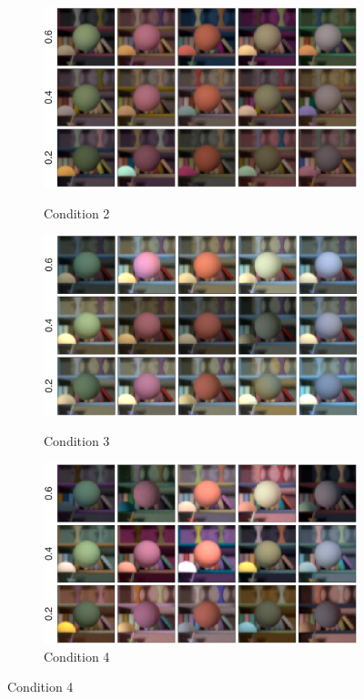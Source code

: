 \documentclass{jov}
\begin{document}
\begin{figure}
\centering
	\begin{subfigure}[b]{0.33 \textwidth}
		\caption{Condition 2}
		\includegraphics[width=\textwidth]{../Figures/Figure2/Figure2_a.png}
 		\label{fig:backgroundVarying}
	\end{subfigure}
	\begin{subfigure}[b]{0.33 \textwidth}
        \caption{Condition 3}	
        \includegraphics[width=\textwidth]{../Figures/Figure2/Figure2_b.png}
        \label{fig:targetIlluminantVarying}
    \end{subfigure}
	\begin{subfigure}[b]{0.33 \textwidth}
	\caption{Condition 4}	
        \includegraphics[width=\textwidth]{../Figures/Figure2/Figure2_c.png}        

\end{subfigure}
\end{figure}
\end{document}
